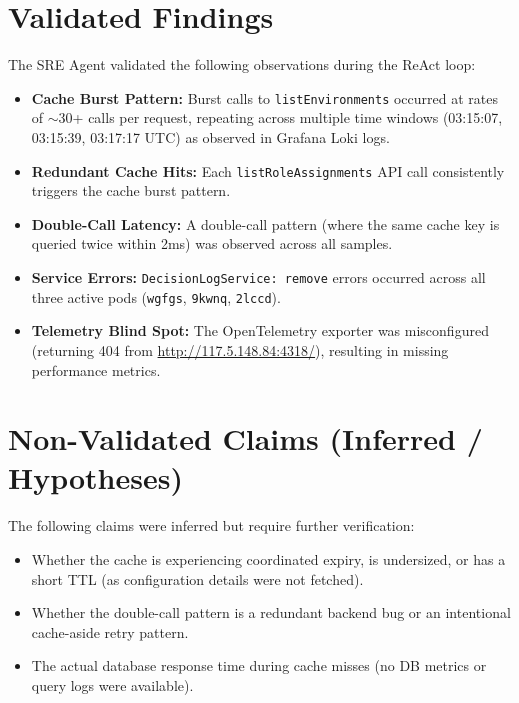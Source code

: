 \documentclass[10pt,a4paper]{article}
\begin{document}
\section{Validated Findings}
The SRE Agent validated the following observations during the ReAct loop:
\begin{itemize}[leftmargin=1.5em, itemsep=2pt]
    \item \textbf{Cache Burst Pattern:} Burst calls to \texttt{listEnvironments} occurred at rates of $\sim$30+ calls per request, repeating across multiple time windows (03:15:07, 03:15:39, 03:17:17 UTC) as observed in Grafana Loki logs.
    \item \textbf{Redundant Cache Hits:} Each \texttt{listRoleAssignments} API call consistently triggers the cache burst pattern.
    \item \textbf{Double-Call Latency:} A double-call pattern (where the same cache key is queried twice within 2ms) was observed across all samples.
    \item \textbf{Service Errors:} \texttt{DecisionLogService: remove} errors occurred across all three active pods (\texttt{wgfgs}, \texttt{9kwnq}, \texttt{2lccd}).
    \item \textbf{Telemetry Blind Spot:} The OpenTelemetry exporter was misconfigured (returning 404 from \url{http://117.5.148.84:4318/}), resulting in missing performance metrics.
\end{itemize}

\vspace{5pt}

\section{Non-Validated Claims (Inferred / Hypotheses)}
The following claims were inferred but require further verification:
\begin{itemize}[leftmargin=1.5em, itemsep=2pt]
    \item Whether the cache is experiencing coordinated expiry, is undersized, or has a short TTL (as configuration details were not fetched).
    \item Whether the double-call pattern is a redundant backend bug or an intentional cache-aside retry pattern.
    \item The actual database response time during cache misses (no DB metrics or query logs were available).
\end{itemize}

\newpage
\end{document}
